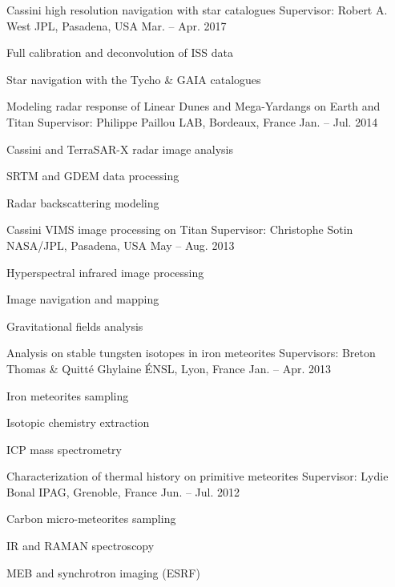 
\begin{cventries}

  \cventry
    {Cassini high resolution navigation with star catalogues}
    {Supervisor: Robert A. West}
    {JPL, Pasadena, USA}
    {Mar. -- Apr. 2017}
    {
      \begin{cvitems}
        \item{Full calibration and deconvolution of ISS data}
        \item{Star navigation with the Tycho \& GAIA catalogues}
      \end{cvitems}
    }

  \cventry
    {Modeling radar response of Linear Dunes and Mega-Yardangs on Earth and Titan}
    {Supervisor: Philippe Paillou}
    {LAB, Bordeaux, France}
    {Jan. -- Jul. 2014}
    {
      \begin{cvitems}
        \item{Cassini and TerraSAR-X radar image analysis}
        \item{SRTM and GDEM data processing}
        \item{Radar backscattering modeling}
      \end{cvitems}
    }

  \cventry
    {Cassini VIMS image processing on Titan}
    {Supervisor: Christophe Sotin}
    {NASA/JPL, Pasadena, USA}
    {May -- Aug. 2013}
    {
      \begin{cvitems}
        \item{Hyperspectral infrared image processing}
        \item{Image navigation and mapping}
        \item{Gravitational fields analysis}
      \end{cvitems}
    }

  \cventry
    {Analysis on stable tungsten isotopes in iron meteorites}
    {Supervisors: Breton Thomas \& Quitté Ghylaine}
    {ÉNSL, Lyon, France}
    {Jan. -- Apr. 2013}
    {
      \begin{cvitems}
        \item{Iron meteorites sampling}
        \item{Isotopic chemistry extraction}
        \item{ICP mass spectrometry}
      \end{cvitems}
    }

  \cventry
    {Characterization of thermal history on primitive meteorites}
    {Supervisor: Lydie Bonal}
    {IPAG, Grenoble, France}
    {Jun. -- Jul. 2012}
    {
      \begin{cvitems}
        \item{Carbon micro-meteorites sampling}
        \item{IR and RAMAN spectroscopy}
        \item{MEB and synchrotron imaging (ESRF)}
      \end{cvitems}
    }


\end{cventries}

